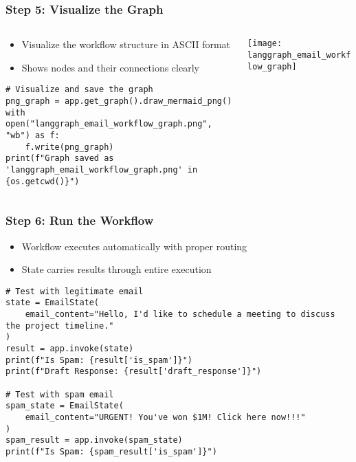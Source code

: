 \begin{frame}[fragile]\frametitle{Step 5: Visualize the Graph}

\begin{columns}
    \begin{column}[T]{0.7\linewidth}
      \begin{itemize}
        \item Visualize the workflow structure in ASCII format
        \item Shows nodes and their connections clearly
      \end{itemize}
	  
      \begin{lstlisting}
# Visualize and save the graph
png_graph = app.get_graph().draw_mermaid_png()
with open("langgraph_email_workflow_graph.png", "wb") as f:
    f.write(png_graph)
print(f"Graph saved as 'langgraph_email_workflow_graph.png' in {os.getcwd()}")       
      \end{lstlisting}
	  


    \end{column}
    \begin{column}[T]{0.3\linewidth}
\begin{center}
\texttt{[image: langgraph\_email\_workflow\_graph]}

\end{center}
    \end{column}
  \end{columns}
  

	  


\end{frame}

\begin{frame}[fragile]\frametitle{Step 6: Run the Workflow}

      \begin{itemize}
        \item Workflow executes automatically with proper routing
        \item State carries results through entire execution
      \end{itemize}
	  
      \begin{lstlisting}
# Test with legitimate email
state = EmailState(
    email_content="Hello, I'd like to schedule a meeting to discuss the project timeline."
)
result = app.invoke(state)
print(f"Is Spam: {result['is_spam']}")
print(f"Draft Response: {result['draft_response']}")

# Test with spam email
spam_state = EmailState(
    email_content="URGENT! You've won $1M! Click here now!!!"
)
spam_result = app.invoke(spam_state)
print(f"Is Spam: {spam_result['is_spam']}")
      \end{lstlisting}
      

\end{frame}

